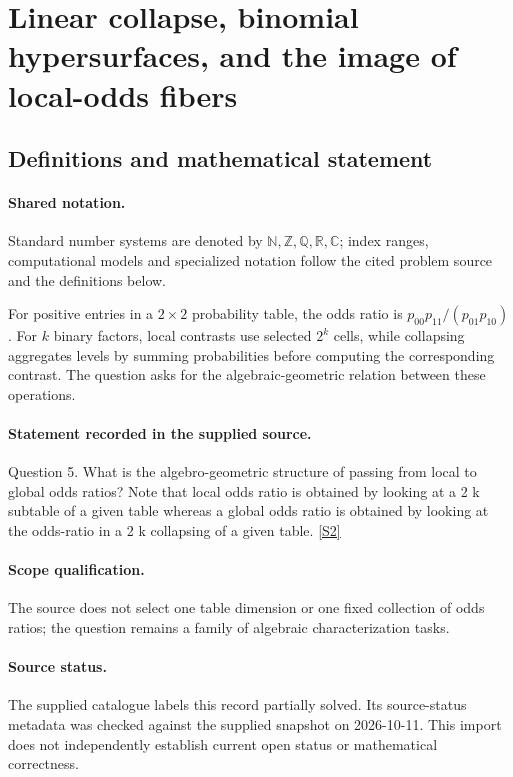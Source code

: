 \documentclass[11pt]{article}
\newcommand{\sref}[2]{\hyperlink{source:#1:#2}{[S#2]}}
\begin{document}
\section{Linear collapse, binomial hypersurfaces, and the image of local-odds fibers}\label{statement}

\subsection{Definitions and mathematical statement}

\paragraph{Shared notation.}Standard number systems are denoted by $\mathbb N,\mathbb Z,\mathbb Q,\mathbb R,\mathbb C$; index ranges, computational models and specialized notation follow the cited problem source and the definitions below.


For positive entries in a $2\times2$ probability table, the odds ratio is $p_{00}p_{11}/(p_{01}p_{10})$. For $k$ binary factors, local contrasts use selected $2^k$ cells, while collapsing aggregates levels by summing probabilities before computing the corresponding contrast. The question asks for the algebraic-geometric relation between these operations.
\paragraph{Statement recorded in the supplied source.}
Question 5. What is the algebro-geometric structure of passing from local to global odds ratios? Note that local odds ratio is obtained by looking at a 2 k subtable of a given table whereas a global odds ratio is obtained by looking at the odds-ratio in a 2 k collapsing of a given table. \sref{statement}{2}
\paragraph{Scope qualification.}
The source does not select one table dimension or one fixed collection of odds ratios; the question remains a family of algebraic characterization tasks.
\paragraph{Source status.}
The supplied catalogue labels this record partially solved. Its source-status metadata was checked against the supplied snapshot on 2026-10-11. This import does not independently establish current open status or mathematical correctness.
\end{document}
